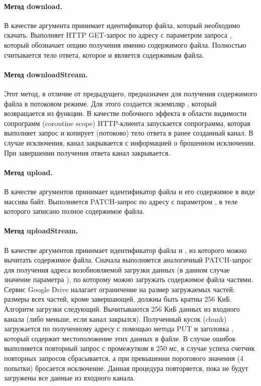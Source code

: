     
    \paragraph{Метод download.} В качестве аргумента принимает идентификатор файла, который необходимо скачать. Выполняет HTTP GET-запрос по адресу  с параметром запроса , который обозначает опцию получения именно содержимого файла. Полностью считывается тело ответа, которое и является содержимым файла.


    \paragraph{Метод downloadStream.} Этот метод, в отличие от предыдущего, предназначен для получения содержимого файла в потоковом режиме. Для этого создается экземпляр , который возвращается из функции. В качестве побочного эффекта в области видимости сопрограмм (coroutine scope) HTTP-клиента запускается сопрограмма, которая выполняет запрос и копирует (потоково) тело ответа в ранее созданный канал. В случае исключения, канал закрывается с информацией о брошенном исключении. При завершении получения ответа канал закрывается.

    \paragraph{Метод upload.} В качестве аргументов принимает идентификатор файла и его содержимое в виде массива байт. Выполняется PATCH-запрос по адресу  с параметром , в теле которого записано полное содержимое файла.

    \paragraph{Метод uploadStream.} В качестве аргументов принимает идентификатор файла и , из которого можно вычитать содержимое файла. Сначала выполняется аналогичный PATCH-запрос для получения адреса возобновляемой загрузки данных (в данном случае значение параметра ), по которому можно загружать содержимое файла частями. Сервис Google Drive налагает ограничение на размер загружаемых частей: размеры всех частей, кроме завершающей, должны быть кратны 256 КиБ. Алгоритм загрузки следующий. Вычитываются 256 КиБ данных из входного канала (либо меньше, если канал закрылся). Полученный кусок (chunk) загружается по полученному адресу с помощью метода PUT и заголовка , который содержит местоположение этих данных в файле. В случае ошибок выполняется повторный запрос с промежутком в 250 мс, в случае успеха счетчик повторных запросов сбрасывается, а при превышении порогового значения (4 попытки) бросается исключение. Данная процедура повторяется, пока не будут загружены все данные из входного канала.

